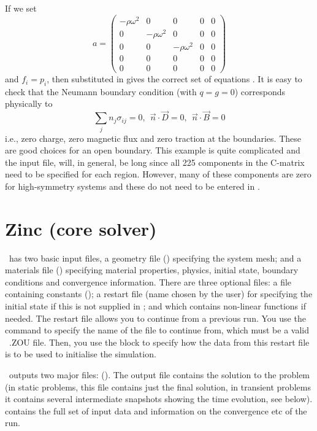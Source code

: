 \documentclass[a4paper,twoside,11pt]{book}
\begin{document}
If we set
\begin{equation}
  a=
  \left(
  \begin{array}{ccccc}
    -\rho\omega^2 & 0 & 0 & 0 & 0\\
    0 & -\rho\omega^2 & 0 & 0 & 0\\
    0 & 0 & -\rho\omega^2 & 0 & 0\\
    0 & 0 & 0 & 0 & 0\\
    0 & 0 & 0 & 0 & 0
  \end{array}\right)
\end{equation}
and $f_i=p_i$, then  substituted in  gives the correct set of equations . It is
easy to check that the Neumann boundary condition  (with
$q=g=0$) corresponds physically to
\begin{equation}
  \sum_j n_j\sigma_{ij}=0,~~ \vec n\cdot\vec D=0,~~ \vec n\cdot\vec B=0
\end{equation}
i.e., zero charge, zero magnetic flux and zero traction at the
boundaries. These are good choices for an open boundary. This example
is quite complicated and the input file,  will, in
general, be long since all 225 components in the C-matrix need to be
specified for each region. However, many of these components are zero
for high-symmetry systems and these do not need to be entered in \zinc.

\chapter{Zinc (core solver)}

\zinc\ has two basic input files, a geometry file ()
specifying the system mesh; and a materials file ()
specifying material properties, physics, initial state, boundary
conditions and convergence information. There are three optional
files: a file containing constants (); a restart
file (name chosen by the user) for specifying the initial state if
this is not supplied in ; and 
which contains non-linear functions if needed. The restart file allows
you to continue from a previous run. You use the command
 to specify the name of the file to continue
from, which must be a valid \zinc\ .ZOU file. Then, you use the
 block  to specify how the data from this
restart file is to be used to initialise the simulation.

\zinc\ outputs two major files: (). The output file  contains the
solution to the problem (in static  problems, this file
contains just the final solution, in transient problems it contains
several intermediate snapshots showing the time evolution, see
 below).  contains the full set of
input data and information on the convergence etc of the run.
\end{document}

